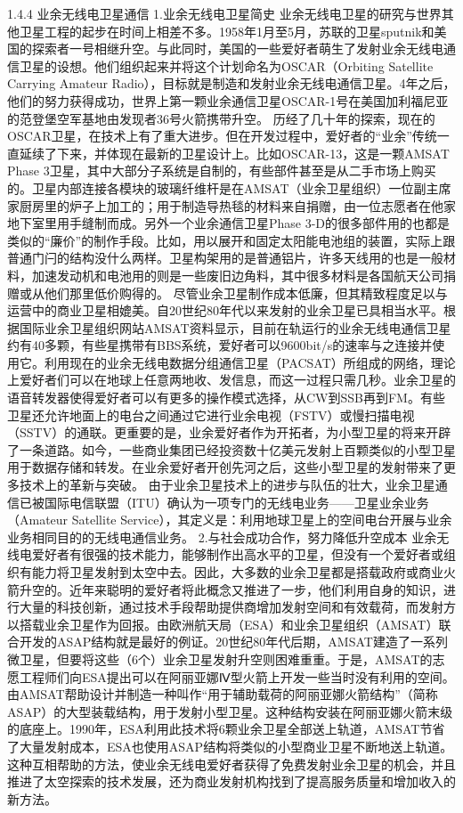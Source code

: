 \documentclass[12pt,UTF8]{ctexbook}
\begin{document}
1.4.4 业余无线电卫星通信
1.业余无线电卫星简史
业余无线电卫星的研究与世界其他卫星工程的起步在时间上相差不多。1958年1月至5月，苏联的卫星sputnik和美国的探索者一号相继升空。与此同时，美国的一些爱好者萌生了发射业余无线电通信卫星的设想。他们组织起来并将这个计划命名为OSCAR（Orbiting Satellite Carrying Amateur Radio），目标就是制造和发射业余无线电通信卫星。4年之后，他们的努力获得成功，世界上第一颗业余通信卫星OSCAR-1号在美国加利福尼亚的范登堡空军基地由发现者36号火箭携带升空。
历经了几十年的探索，现在的OSCAR卫星，在技术上有了重大进步。但在开发过程中，爱好者的“业余”传统一直延续了下来，并体现在最新的卫星设计上。比如OSCAR-13，这是一颗AMSAT Phase 3卫星，其中大部分子系统是自制的，有些部件甚至是从二手市场上购买的。卫星内部连接各模块的玻璃纤维杆是在AMSAT（业余卫星组织）一位副主席家厨房里的炉子上加工的；用于制造导热毯的材料来自捐赠，由一位志愿者在他家地下室里用手缝制而成。另外一个业余通信卫星Phase 3-D的很多部件用的也都是类似的“廉价”的制作手段。比如，用以展开和固定太阳能电池组的装置，实际上跟普通门闩的结构没什么两样。卫星构架用的是普通铝片，许多天线用的也是一般材料，加速发动机和电池用的则是一些废旧边角料，其中很多材料是各国航天公司捐赠或从他们那里低价购得的。
尽管业余卫星制作成本低廉，但其精致程度足以与运营中的商业卫星相媲美。自20世纪80年代以来发射的业余卫星已具相当水平。根据国际业余卫星组织网站AMSAT资料显示，目前在轨运行的业余无线电通信卫星约有40多颗，有些星携带有BBS系统，爱好者可以9600bit/s的速率与之连接并使用它。利用现在的业余无线电数据分组通信卫星（PACSAT）所组成的网络，理论上爱好者们可以在地球上任意两地收、发信息，而这一过程只需几秒。业余卫星的语音转发器使得爱好者可以有更多的操作模式选择，从CW到SSB再到FM。有些卫星还允许地面上的电台之间通过它进行业余电视（FSTV）或慢扫描电视（SSTV）的通联。更重要的是，业余爱好者作为开拓者，为小型卫星的将来开辟了一条道路。如今，一些商业集团已经投资数十亿美元发射上百颗类似的小型卫星用于数据存储和转发。在业余爱好者开创先河之后，这些小型卫星的发射带来了更多技术上的革新与突破。
由于业余卫星技术上的进步与队伍的壮大，业余卫星通信已被国际电信联盟（ITU）确认为一项专门的无线电业务——卫星业余业务（Amateur Satellite Service），其定义是：利用地球卫星上的空间电台开展与业余业务相同目的的无线电通信业务。
2.与社会成功合作，努力降低升空成本
业余无线电爱好者有很强的技术能力，能够制作出高水平的卫星，但没有一个爱好者或组织有能力将卫星发射到太空中去。因此，大多数的业余卫星都是搭载政府或商业火箭升空的。近年来聪明的爱好者将此概念又推进了一步，他们利用自身的知识，进行大量的科技创新，通过技术手段帮助提供商增加发射空间和有效载荷，而发射方以搭载业余卫星作为回报。由欧洲航天局（ESA）和业余卫星组织（AMSAT）联合开发的ASAP结构就是最好的例证。20世纪80年代后期，AMSAT建造了一系列微卫星，但要将这些（6个）业余卫星发射升空则困难重重。于是，AMSAT的志愿工程师们向ESA提出可以在阿丽亚娜Ⅳ型火箭上开发一些当时没有利用的空间。由AMSAT帮助设计并制造一种叫作“用于辅助载荷的阿丽亚娜火箭结构”（简称ASAP）的大型装载结构，用于发射小型卫星。这种结构安装在阿丽亚娜火箭末级的底座上。1990年，ESA利用此技术将6颗业余卫星全部送上轨道，AMSAT节省了大量发射成本，ESA也使用ASAP结构将类似的小型商业卫星不断地送上轨道。这种互相帮助的方法，使业余无线电爱好者获得了免费发射业余卫星的机会，并且推进了太空探索的技术发展，还为商业发射机构找到了提高服务质量和增加收入的新方法。
\end{document}
